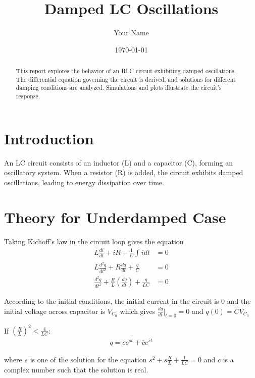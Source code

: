 \documentclass[a4paper,12pt]{article}
\title{Damped LC Oscillations}
\author{Your Name}
\date{\today}
\providecommand{\brak}[1]{\ensuremath{\left(#1\right)}}
\begin{document}
\maketitle

\begin{abstract}
This report explores the behavior of an RLC circuit exhibiting damped oscillations. The differential equation governing the circuit is derived, and solutions for different damping conditions are analyzed. Simulations and plots illustrate the circuit's response.
\end{abstract}

\section{Introduction}
An LC circuit consists of an inductor (L) and a capacitor (C), forming an oscillatory system. When a resistor (R) is added, the circuit exhibits damped oscillations, leading to energy dissipation over time.

\section{Theory for Underdamped Case}
Taking Kichoff's law in the circuit loop gives the equation 
\begin{align*}
  L\frac{di}{dt} + iR + \frac{1}{C}\int_{}^{}idt &= 0\\
  L\frac{d^2q}{dt^2} + R\frac{dq}{dt} + \frac{q}{C} &= 0\\
  \frac{d^2q}{dt^2} + \frac{R}{L}\brak{\frac{dq}{dt}} + \frac{q}{LC} &= 0
\end{align*}

According to the initial conditions, the initial current in the circuit is 0 and the initial voltage across capacitor is $V_{C_0}$ which gives $\frac{dq}{dt}\Bigr|_{t=0} = 0 $ and $ q(0) = CV_{C_0} $

If $\brak{\frac{R}{L}}^2 < \frac{4}{LC}$:
\begin{align*}
q = ce^{st} + \overline{c}e^{\overline{s}t}
\end{align*}

where $s$ is one of the solution for the equation $s^2 + s\frac{R}{L} + \frac{1}{LC} = 0$ and $c$ is a complex number such that the solution is real.\newline
\end{document}
